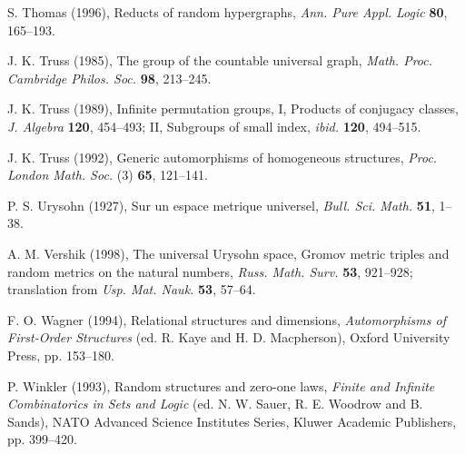 \documentclass{book}
\begin{document}
\begin{thebibliography}{99}
S. Thomas (1996),
Reducts of random hypergraphs,
\textit{Ann. Pure Appl. Logic} \textbf{80}, 165--193.

J. K. Truss (1985),
The group of the countable universal graph,
\textit{Math. Proc. Cambridge Philos. Soc.} \textbf{98}, 213--245.

J. K. Truss (1989),
Infinite permutation groups, I, Products of conjugacy classes,
\textit{J. Algebra} \textbf{120}, 454--493;
II, Subgroups of small index,
\textit{ibid.} \textbf{120}, 494--515.

J. K. Truss (1992),
Generic automorphisms of homogeneous structures,
\textit{Proc. London Math. Soc.} (3) \textbf{65}, 121--141.

P. S. Urysohn (1927),
Sur un espace metrique universel,
\textit{Bull. Sci. Math.} \textbf{51}, 1--38.

A. M. Vershik (1998),
The universal Urysohn space, Gromov metric triples and random metrics on the
natural numbers,
\textit{Russ. Math. Surv.} \textbf{53}, 921--928; translation from
\textit{Usp. Mat. Nauk.} \textbf{53}, 57--64.

F. O. Wagner (1994),
Relational structures and dimensions,
\textit{Automorphisms of First-Order Structures} (ed. R. Kaye and H. D.
Macpherson), Oxford University Press, pp. 153--180.

P. Winkler (1993),
Random structures and zero-one laws,
\textit{Finite and Infinite Combinatorics in Sets and Logic}
(ed. N. W. Sauer, R. E. Woodrow and B. Sands),
NATO Advanced Science Institutes Series, Kluwer Academic Publishers,
pp. 399--420.

\end{thebibliography}
\end{document}
